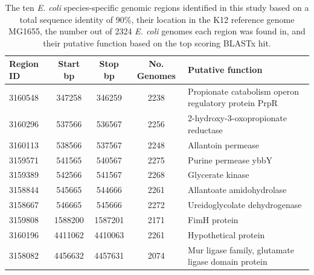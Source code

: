 \documentclass[doublespacing, linenumbers]{bmcart}
\begin{document}
\begin{backmatter}
\newpage
\begin{table}[h!]
\caption{The ten \textit{E. coli} species-specific genomic regions identified in this study based on a total sequence identity of 90\%, their location in the K12 reference genome MG1655, the number out of 2324 \textit{E. coli} genomes each region was found in, and their putative function based on the top scoring BLASTx hit.}
\label{tab:specific_location_function}
      \begin{tabular}{lcccl}
        \hline
        Region ID & Start bp & Stop bp & No. Genomes & Putative function\\ 
        \hline
        3160548 & 347258  & 346259  &  2238 & Propionate catabolism operon regulatory protein PrpR\\
        3160296 & 537566  & 536567  &  2256 & 2-hydroxy-3-oxopropionate reductase\\
        3160113 & 538566  & 537567  &  2248 & Allantoin permease\\
        3159571 & 541565  & 540567  &  2275 & Purine permease ybbY\\
        3159389 & 542566  & 541567  &  2268 & Glycerate kinase\\
        3158844 & 545665  & 544666  &  2261 & Allantoate amidohydrolase\\
        3158667 & 546665  & 545666  &  2272 & Ureidoglycolate dehydrogenase\\        
        3159808 & 1588200 & 1587201 &  2171 & FimH protein\\       
        3160196 & 4411062 & 4410063 & 2261 & Hypothetical protein\\
        3158082 & 4456632 & 4457631 &  2074 & Mur ligase family, glutamate ligase domain protein\\
        \hline
      \end{tabular}
\end{table}






\end{backmatter}
\end{document}

